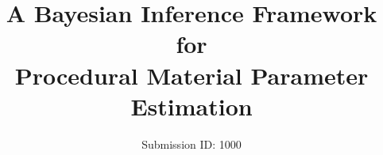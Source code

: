 

%
\title[Bayesian Inference]%
      {A Bayesian Inference Framework for \\ Procedural Material Parameter Estimation}

\author[Submission ID: 1000]
{\parbox{\textwidth}{\centering Submission ID: 1000
        }
        \\
{\parbox{\textwidth}{\centering 
       }
}
}

%





